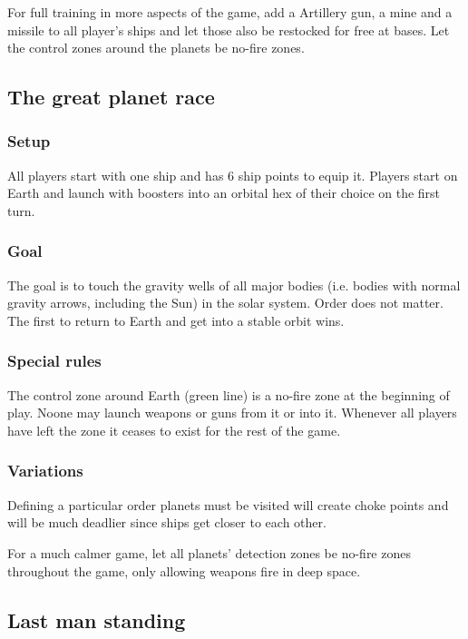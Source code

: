 \documentclass[a4paper,12pt,notitlepage,twocolumn]{article}
\begin{document}
For full training in more aspects of the game, add a Artillery gun, a mine and a
missile to all player's ships and let those also be restocked for free
at bases. Let the control zones around the planets be no-fire
zones. 

\subsection{The great planet race}

\subsubsection*{Setup}

All players start with one ship and has 6 ship points to equip it. 
Players start on Earth and launch with boosters into an orbital hex 
of their choice on the first turn. 

\subsubsection*{Goal}

The goal is to touch the gravity wells of all major bodies
(i.e. bodies with normal gravity arrows, including the Sun) in the
solar system. Order does not matter. The first to return to Earth and get into a stable orbit
wins. 

\subsubsection*{Special rules}

The control zone around Earth (green line) is a no-fire zone at the
beginning of play. Noone may launch weapons or guns from it or into
it.  Whenever all players have left the zone it ceases to exist for the rest of the
game. 

\subsubsection*{Variations}

Defining a particular order planets must be visited will create choke points and
will be much deadlier since ships get closer to each other. 

For a much calmer game, let all planets' detection zones be no-fire
zones throughout the game, only allowing weapons fire in deep space. 

\subsection{Last man standing}
\end{document}
